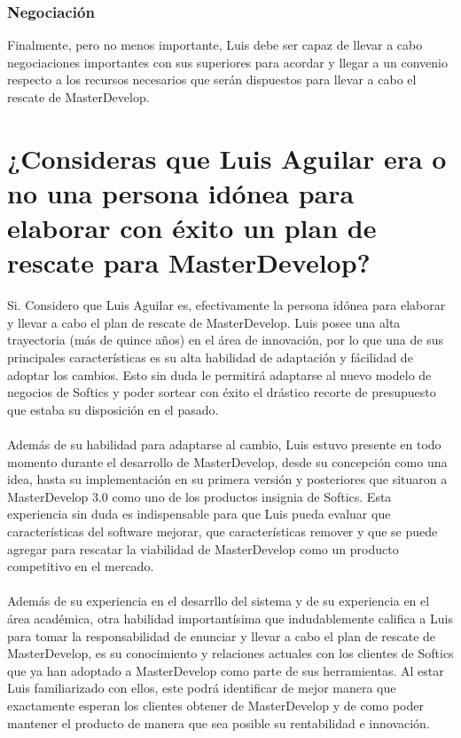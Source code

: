 \documentclass{article}
\begin{document}
    \subsubsection{Negociación}
    Finalmente, pero no menos importante, Luis debe ser capaz 
    de llevar a cabo negociaciones importantes con sus superiores
    para acordar y llegar a un convenio respecto a los recursos
    necesarios que serán dispuestos para llevar a cabo el 
    rescate de MasterDevelop. 

\section{¿Consideras que Luis Aguilar era o no una persona idónea para elaborar con éxito un 
    plan de rescate para MasterDevelop?}

	Si. Considero que Luis Aguilar es, efectivamente la persona
	idónea para elaborar y llevar a cabo el plan de rescate
	de MasterDevelop. Luis posee una alta trayectoria (más de
	quince años) en el área de innovación, por lo que una
	de sus principales características es su alta habilidad de
	adaptación y fácilidad de adoptar los cambios. Esto sin duda
	le permitirá adaptarse al nuevo modelo de negocios de 
	Softics y poder sortear con éxito el drástico recorte de 
	presupuesto que estaba su disposición en el pasado.
	\\\\
	Además de su habilidad para adaptarse al cambio, Luis
	estuvo presente en todo momento durante el desarrollo de
	MasterDevelop, desde su concepción como una idea, hasta
	su implementación en su primera versión y posteriores que
	situaron a MasterDevelop 3.0 como uno de los productos
	insignia de Softics. Esta experiencia sin duda es 
	indispensable para que Luis pueda evaluar que características
	del software mejorar, que características remover y que 
	se puede agregar para rescatar la viabilidad de 
	MasterDevelop como un producto competitivo en el mercado.
	\\\\
	Además de su experiencia en el desarrllo del sistema y 
	de su experiencia en el área académica, otra habilidad
	importantísima que indudablemente califica a Luis para
	tomar la responsabilidad de enunciar y llevar a cabo el 
	plan de rescate de MasterDevelop, es su conocimiento y 
	relaciones actuales con los clientes de Softics que ya han 
	adoptado a MasterDevelop como parte de sus herramientas. 
	Al estar Luis familiarizado con ellos, este podrá identificar
	de mejor manera que exactamente esperan los clientes obtener
	de MasterDevelop y de como poder mantener el producto de
	manera que sea posible su rentabilidad e innovación.
\end{document}
